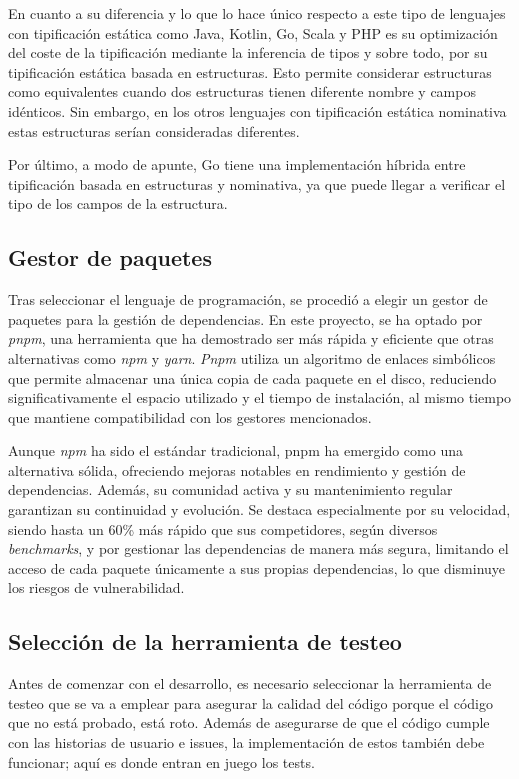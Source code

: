 En cuanto a su diferencia y lo que lo hace único respecto a este tipo de lenguajes con tipificación estática como Java, Kotlin, Go, Scala y PHP es su optimización del coste de la tipificación mediante la inferencia de tipos y sobre todo, por su tipificación estática basada en estructuras. Esto permite considerar estructuras como equivalentes cuando dos estructuras tienen diferente nombre y campos idénticos. Sin embargo, en los otros lenguajes con tipificación estática nominativa estas estructuras serían consideradas diferentes.

Por último, a modo de apunte, Go tiene una implementación híbrida entre tipificación basada en estructuras y nominativa, ya que puede llegar a verificar el tipo de los campos de la estructura.

\subsection{Gestor de paquetes}

Tras seleccionar el lenguaje de programación, se procedió a elegir un gestor de paquetes para la gestión de dependencias. En este proyecto, se ha optado por \textit{pnpm}, una herramienta que ha demostrado ser más rápida y eficiente que otras alternativas como \textit{npm} y \textit{yarn}. \textit{Pnpm} utiliza un algoritmo de enlaces simbólicos que permite almacenar una única copia de cada paquete en el disco, reduciendo significativamente el espacio utilizado y el tiempo de instalación, al mismo tiempo que mantiene compatibilidad con los gestores mencionados.

Aunque \textit{npm} ha sido el estándar tradicional, pnpm ha emergido como una alternativa sólida, ofreciendo mejoras notables en rendimiento y gestión de dependencias. Además, su comunidad activa y su mantenimiento regular garantizan su continuidad y evolución. Se destaca especialmente por su velocidad, siendo hasta un 60\% más rápido que sus competidores, según diversos \textit{benchmarks}, y por gestionar las dependencias de manera más segura, limitando el acceso de cada paquete únicamente a sus propias dependencias, lo que disminuye los riesgos de vulnerabilidad.

\subsection{Selección de la herramienta de testeo}

Antes de comenzar con el desarrollo, es necesario seleccionar la herramienta de testeo que se va a emplear para asegurar la calidad del código porque el código que no está probado, está roto. Además de asegurarse de que el código cumple con las historias de usuario e issues, la implementación de estos también debe funcionar; aquí es donde entran en juego los tests.

